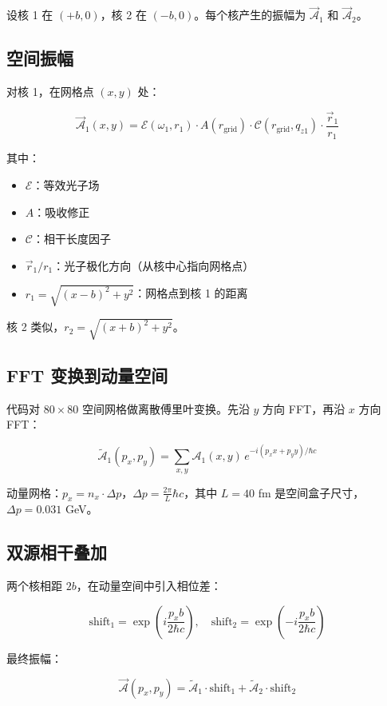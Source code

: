 \documentclass[11pt,a4paper,UTF8]{ctexart}
\begin{document}
设核 1 在 $(+b, 0)$，核 2 在 $(-b, 0)$。每个核产生的振幅为 $\vec{\mathcal{A}}_1$ 和 $\vec{\mathcal{A}}_2$。

\subsection{空间振幅}

对核 1，在网格点 $(x,y)$ 处：

\[
\vec{\mathcal{A}}_1(x,y) = \mathcal{E}(\omega_1, r_1) \cdot A(r_{\text{grid}}) \cdot \mathcal{C}(r_{\text{grid}}, q_{z1}) \cdot \frac{\vec{r}_1}{r_1}
\]

其中：
\begin{itemize}[leftmargin=2em]
    \item $\mathcal{E}$：等效光子场
    \item $A$：吸收修正
    \item $\mathcal{C}$：相干长度因子
    \item $\vec{r}_1/r_1$：光子极化方向（从核中心指向网格点）
    \item $r_1 = \sqrt{(x-b)^2 + y^2}$：网格点到核 1 的距离
\end{itemize}

核 2 类似，$r_2 = \sqrt{(x+b)^2 + y^2}$。

\subsection{FFT 变换到动量空间}

代码对 $80 \times 80$ 空间网格做离散傅里叶变换。先沿 $y$ 方向 FFT，再沿 $x$ 方向 FFT：

\[
\tilde{\mathcal{A}}_1(p_x, p_y) = \sum_{x,y} \mathcal{A}_1(x,y) \, e^{-i(p_x x + p_y y)/\hbar c}
\]

动量网格：$p_x = n_x \cdot \Delta p$，$\Delta p = \frac{2\pi}{L} \hbar c$，其中 $L = 40$ fm 是空间盒子尺寸，$\Delta p = 0.031$ GeV。

\subsection{双源相干叠加}

两个核相距 $2b$，在动量空间中引入相位差：

\[
\text{shift}_1 = \exp\left(i \frac{p_x b}{2\hbar c}\right), \quad 
\text{shift}_2 = \exp\left(-i \frac{p_x b}{2\hbar c}\right)
\]

最终振幅：

\[
\vec{\mathcal{A}}(p_x, p_y) = \tilde{\mathcal{A}}_1 \cdot \text{shift}_1 + \tilde{\mathcal{A}}_2 \cdot \text{shift}_2
\]
\end{document}
